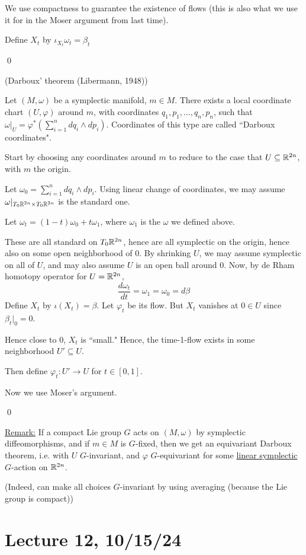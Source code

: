 \documentclass[x11names,reqno,14pt]{extarticle}
\newcommand{\dd}[2]{\frac{d#1}{d#2}}
\begin{document}
We use compactness to guarantee the existence of flows (this is also what we use it for in the Moser argument from last time). 

Define $X_t$ by $\iota_{X_t}\omega_t=\beta_t$

\qed

\thm(Darboux' theorem (Libermann, 1948))

Let $(M,\omega)$ be a symplectic manifold, $m\in M$. There exists a local coordinate chart $(U,\varphi)$ around $m$, with coordinates $q_1,p_1,\dots,q_n,p_n$, such that $\omega|_U = \varphi^*(\sum_{i=1}^n dq_i\wedge dp_i)$. Coordinates of this type are called ``Darboux coordinates".

\proof

Start by choosing any coordinates around $m$ to reduce to the case that $U \subseteq \mathbb{R}^{2n}$, with $m$ the origin. 

Let $\omega_0 = \sum_{i=1}^n dq_i \wedge dp_i$. Using linear change of coordinates, we may assume $\omega|_{T_0\mathbb{R}^{2n}\times T_0\mathbb{R}^{2n}}$ is the standard one. 

Let $\omega_t = (1-t)\omega_0 + t\omega_1$, where $\omega_1$ is the $\omega$ we defined above. 

These are all standard on $T_0\mathbb{R}^{2n}$, hence are all symplectic on the origin, hence also on some open neighborhood of 0. By shrinking $U$, we may assume symplectic on all of $U$, and may also assume $U$ is an open ball around 0. Now, by de Rham homotopy operator for $U = \mathbb{R}^{2n}$, 
\[
\dd{\omega_t}{t} = \omega_1 = \omega_0 = d\beta
\]
Define $X_t$ by $\iota(X_t) = \beta$. Let $\varphi_t$ be its flow.  But $X_t$ vanishes at $0\in U$ since $\beta_t|_0 = 0$. 

Hence close to 0, $X_t$ is ``small." Hence, the time-1-flow exists in some neighborhood $U'\subseteq U$.

Then define $\varphi_t:U'\to U$ for $t \in [0,1]$.

Now we use Moser's argument. 

\qed

\underline{Remark:} If a compact Lie group $G$ acts on $(M,\omega)$ by symplectic diffeomorphisms, and if $m\in M$ is $G$-fixed, then we get an equivariant Darboux theorem, i.e. with $U$ $G$-invariant, and $\varphi$ $G$-equivariant for some \underline{linear symplectic} $G$-action on $\mathbb{R}^{2n}$.

(Indeed, can make all choices $G$-invariant by using averaging (because the Lie group is compact))


\section*{Lecture 12, 10/15/24}
\end{document}
